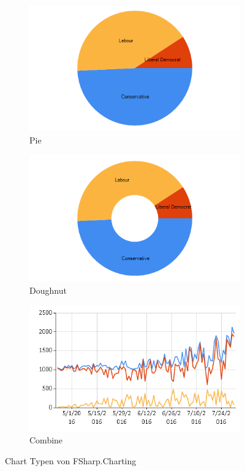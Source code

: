 \begin{figure}[htb]
	\begin{subfigure}[b]{.30\linewidth}
		\centering
		\includegraphics[width=1\linewidth]{images/charting-pie.png}
		\caption{Pie}
	\end{subfigure}
	\begin{subfigure}[b]{.30\linewidth}
		\centering
		\includegraphics[width=1\linewidth]{images/charting-doughnut.png}
		\caption{Doughnut}
	\end{subfigure}
	\begin{subfigure}[b]{.30\linewidth}
		\centering
		\includegraphics[width=1\linewidth]{images/charting-combine.png}
		\caption{Combine}
	\end{subfigure}
  \caption{Chart Typen von FSharp.Charting}
\end{figure}

